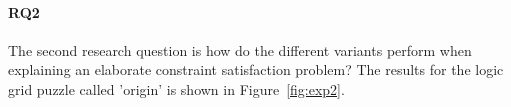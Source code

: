 

\paragraph{RQ2}
The second research question is how do the different variants perform when explaining an elaborate constraint satisfaction problem? The results for the logic grid puzzle called 'origin' is shown in Figure~\ref{fig:exp2}.

